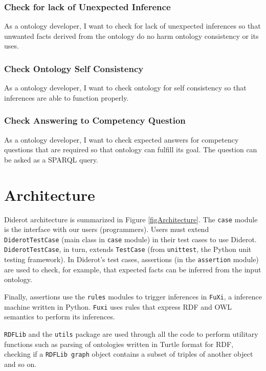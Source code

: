 \documentclass{report}
\begin{document}
\subsubsection{Check for lack of Unexpected Inference}

As a ontology developer, I want to check for lack of unexpected inferences so that unwanted facts
derived from the ontology do no harm ontology consistency or its uses.

\subsubsection{Check Ontology Self Consistency}

As a ontology developer, I want to check ontology for self consistency so that inferences are able to
function properly.

\subsubsection{Check Answering to Competency Question}

As a ontology developer, I want to check expected answers for competency questions that are required
so that ontology can fulfill its goal. The question can be asked as a SPARQL query.

\section{Architecture}

Diderot architecture is summarized in Figure \ref{figArchitecture}.
The \texttt{case} module is the interface with our users (programmers).
Users must extend \texttt{DiderotTestCase} (main class in \texttt{case} module) in their test cases to use Diderot.
\texttt{DiderotTestCase}, in turn, extends \texttt{TestCase} (from \texttt{unittest}, the Python unit testing framework).
In Diderot's test cases, assertions (in the \texttt{assertion} module) are used to check, for example, that expected facts can be inferred from the input ontology.

Finally, assertions use the \texttt{rules} modules to trigger inferences in \texttt{FuXi}, a inference machine written in Python.
\texttt{Fuxi} uses rules that express RDF and OWL semantics to perform its inferences.

\texttt{RDFLib} and the \texttt{utils} package are used through all the code to perform utilitary functions such as parsing of ontologies written in Turtle format for RDF, checking if a \texttt{RDFLib graph} object contains a subset of triples of another object and so on.
\end{document}
